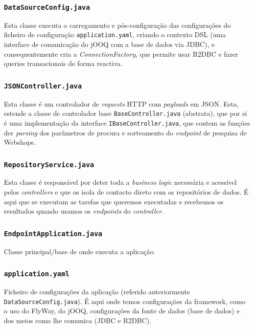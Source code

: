 \subsubsection*{\texttt{DataSourceConfig.java}}

Esta classe executa o carregamento e pós-configuração das configurações do ficheiro de configuração \texttt{application.yaml}, criando o contexto DSL (uma interface de comunicação do jOOQ com a base de dados via JDBC), e consequentemente cria a \textit{ConnectionFactory}, que permite usar R2DBC e fazer queries transacionais de forma reactiva.

\subsubsection*{\texttt{JSONController.java}}

Esta classe é um controlador de \textit{requests} HTTP com \textit{payloads} em JSON. Esta, estende a classe de controlador base \texttt{BaseController.java} (abstrata), que por si é uma implementação da interface \texttt{IBaseController.java}, que contem as funções der \textit{parsing} dos parâmetros de procura e sorteamento do \textit{endpoint} de pesquisa de Webshops.

\subsubsection*{\texttt{RepositoryService.java}}

Esta classe é responsável por deter toda a \textit{business logic} necessária e acessível pelos \textit{controllers} e que os isola de contacto direto com os repositórios de dados. É aqui que se executam as tarefas que queremos executadas e recebemos os resultados quando usamos os \textit{endpoints} do \textit{controller}.

\newpage

\subsubsection*{\texttt{EndpointApplication.java}}

Classe principal/base de onde executa a aplicação.

\subsubsection*{\texttt{application.yaml}}

Ficheiro de configurações da aplicação (referido anteriormente \texttt{DataSourceConfig.java}). É aqui onde temos configurações da framework, como o uso do FlyWay, do jOOQ, configurações da fonte de dados (base de dados) e dos meios como lhe comunica (JDBC e R2DBC).

